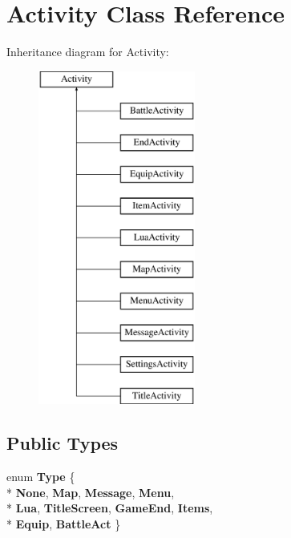 \hypertarget{classActivity}{\section{Activity Class Reference}
\label{classActivity}
}
Inheritance diagram for Activity\-:\begin{figure}[H]
\begin{center}
\leavevmode
\includegraphics[height=11.000000cm]{classActivity}
\end{center}
\end{figure}
\subsection*{Public Types}
\begin{DoxyCompactItemize}
\item 
enum {\bfseries Type} \{ \\*
{\bfseries None}, 
{\bfseries Map}, 
{\bfseries Message}, 
{\bfseries Menu}, 
\\*
{\bfseries Lua}, 
{\bfseries Title\-Screen}, 
{\bfseries Game\-End}, 
{\bfseries Items}, 
\\*
{\bfseries Equip}, 
{\bfseries Battle\-Act}
 \}
\end{DoxyCompactItemize}
